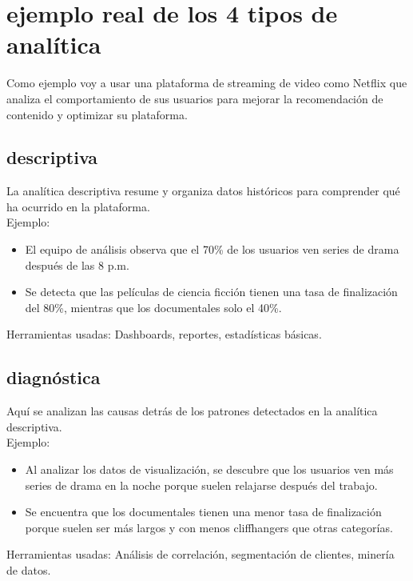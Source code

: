 \documentclass[12pt]{article}
\begin{document}
\clearpage

\section{ejemplo real de los 4 tipos de analítica}

Como ejemplo voy a usar una plataforma de streaming de video como Netflix que analiza
el comportamiento de sus usuarios para mejorar la recomendación de contenido y optimizar su plataforma.

\subsection{descriptiva}

La analítica descriptiva resume y organiza datos históricos para comprender qué ha ocurrido en la plataforma.
\\
Ejemplo:

\begin{itemize}
    \item El equipo de análisis observa que el 70\% de los usuarios ven series de drama después de las 8 p.m.
    \item Se detecta que las películas de ciencia ficción tienen una tasa de finalización del 80\%,
    mientras que los documentales solo el 40\%.
\end{itemize}

Herramientas usadas: Dashboards, reportes, estadísticas básicas.

\subsection{diagnóstica}

Aquí se analizan las causas detrás de los patrones detectados en la analítica descriptiva.
\\
Ejemplo:
\begin{itemize}
    \item Al analizar los datos de visualización, se descubre que los usuarios ven más series de drama en
    la noche porque suelen relajarse después del trabajo.
    \item Se encuentra que los documentales tienen una menor tasa de finalización porque suelen ser más largos y 
    con menos cliffhangers que otras categorías.
\end{itemize}

Herramientas usadas: Análisis de correlación, segmentación de clientes, minería de datos.
\end{document}
